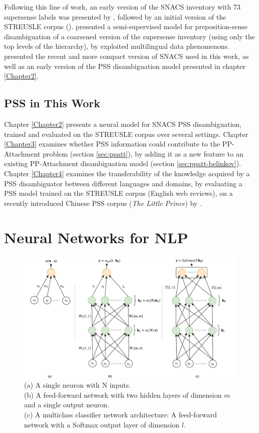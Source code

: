 Following this line of work, an early version of the SNACS inventory with 73 supersense labels was presented by \cite{schneider-15}, followed by an initial version of the STREUSLE corpus (\cite{schneider-16}). \cite{gonen-16} presented a semi-supervised model for preposition-sense disambiguation of a coarsened version of the supersense inventory (using only the top levels of the hierarchy), by exploited multilingual data phenomenons. \cite{snacs} presented the recent and more compact version of SNACS used in this work, as well as an early version of the PSS disambiguation model presented in chapter \ref{Chapter2}.

\subsection{PSS in This Work}

Chapter \ref{Chapter2} presents a neural model for SNACS PSS disambiguation, trained and evaluated on the STREUSLE corpus over several settings. Chapter \ref{Chapter3} examines whether PSS information could contribute to the PP-Attachment problem (section \ref{sec:ppatt}), by adding it as a new feature to an existing PP-Attachment disambiguation model (section \ref{sec:ppatt-belinkov}). Chapter \ref{Chapter4} examines the transferability of the knowledge acquired by a PSS disambiguator between different languages and domains, by evaluating a PSS model trained on the STREUSLE corpus (English web reviews), on a recently introduced Chinese PSS corpus (\textit{The Little Prince}) by \cite{chinesecorpus}.

\pagebreak

\section{Neural Networks for NLP}

\begin{figure}[htbp]
  \centering
    \includegraphics[width=1\textwidth]{Figures/neurons.pdf}
  \caption{ 
    (a) A single neuron with N inputs. \\
    (b) A feed-forward network with two hidden layers of dimension $m$ and a single output neuron. \\
    (c) A multiclass classifier network architecture: A feed-forward network with a Softmax output layer of dimension $l$.}
  \label{fig:networks}
\end{figure}

